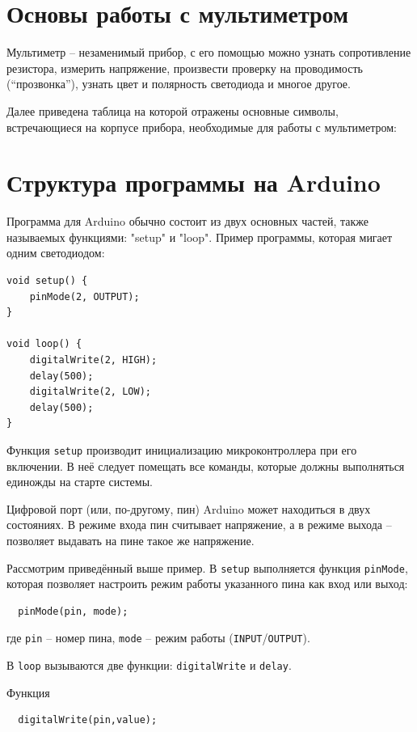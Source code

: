 \documentclass[a4paper,twoside]{book}
\begin{document}
\section{Основы работы с мультиметром}
Мультиметр -- незаменимый прибор, с его помощью можно узнать сопротивление
резистора, измерить напряжение, произвести проверку на проводимость
(``прозвонка''), узнать цвет и полярность светодиода и многое другое.

Далее приведена таблица на которой отражены основные символы, встречающиеся на
корпусе прибора, необходимые для работы с мультиметром:


\section{Структура программы на Arduino}

Программа для Arduino обычно состоит из двух основных частей, также называемых
функциями: "setup" и "loop". Пример программы, которая мигает одним светодиодом:
\begin{verbatim}
void setup() {
    pinMode(2, OUTPUT);
}

void loop() {
    digitalWrite(2, HIGH);
    delay(500);
    digitalWrite(2, LOW);
    delay(500);
}
\end{verbatim}

Функция \texttt{setup} производит инициализацию микроконтроллера при его
включении. В неё следует помещать все команды, которые должны выполняться
единожды на старте системы.

Цифровой порт (или, по-другому, пин) Arduino может находиться в двух состояниях.
В режиме входа пин считывает напряжение, а в режиме выхода – позволяет выдавать
на пине такое же напряжение.

Рассмотрим приведённый выше пример. В \texttt{setup} выполняется функция
\texttt{pinMode}, которая позволяет настроить режим работы указанного пина как
вход или выход:

\begin{verbatim}
  pinMode(pin, mode);
\end{verbatim}

где \texttt{pin} -- номер пина, \texttt{mode} -- режим работы
(\texttt{INPUT}/\texttt{OUTPUT}).

В \texttt{loop} вызываются две функции: \texttt{digitalWrite} и \texttt{delay}.

Функция
\begin{verbatim}
  digitalWrite(pin,value);
\end{verbatim}
\end{document}
